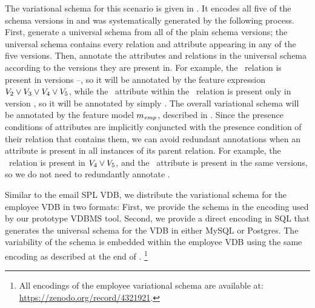 

The variational schema for this scenario is given in . It
encodes all five of the schema versions in  and was
systematically generated by the following process. First, generate a universal
schema from all of the plain schema versions; the universal schema contains
every relation and attribute appearing in any of the five versions. Then,
annotate the attributes and relations in the universal schema according to the
versions they are present in.
%
For example, the \empacct\ relation is present in versions \vTwo--\vFive, so it
will be annotated by the feature expression
$\vTwo\vee\vThree\vee\vFour\vee\vFive$, while the \salary\ attribute within the
\empacct\ relation is present only in version \vFive, so it will be annotated
by simply \vFive.
%
 The overall variational schema will be annotated by the feature model
 $\fModel_\employee$, described in .
%
Since the presence conditions of attributes are implicitly conjuncted with the
presence condition of their relation
 that contains them, 
 we can avoid redundant
annotations when an attribute is present in all instances of its parent
relation. For example, the \empbio\ relation is present in $\vFour\vee\vFive$,
and the \birthdate\ attribute is present in the same versions, so we do not
need to redundantly annotate 
 \birthdate.

Similar to the email SPL VDB, we distribute the variational schema for the
employee VDB in two formats:
%
First, we provide the schema in the encoding used by our prototype VDBMS tool.%
%
Second, we provide a direct encoding in SQL that generates the universal schema
for the VDB in either MySQL or Postgres.%
%
The variability of the schema is embedded within the employee VDB%
%
using the same encoding as described at the end of .%
\footnote{All encodings of the employee variational schema are available at: \url{https://zenodo.org/record/4321921}.} 

